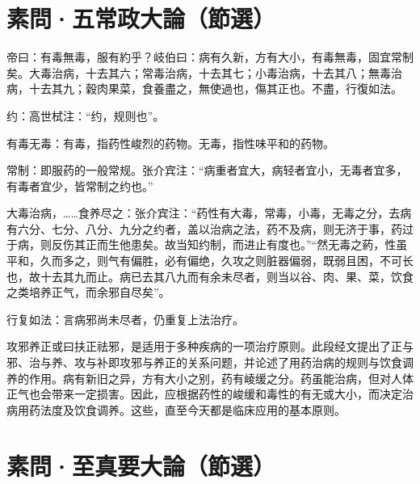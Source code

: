 \documentclass[draft,12pt]{ctexbook}
\begin{document}

\section{素問·五常政大論（節選）}%


\begin{yuanwen}
帝曰：有毒無毒，服有約乎？岐伯曰：病有久新，方有大小，有毒無毒，固宜常制矣。大毒治病，十去其六；常毒治病，十去其七；小毒治病，十去其八；無毒治病，十去其九；穀肉果菜，食養盡之，無使過也，傷其正也。不盡，行復如法。
\end{yuanwen}


\begin{jiaozhu}
  \item 约：高世栻注：“约，规则也”。
  \item 有毒无毒：有毒，指药性峻烈的药物。无毒，指性味平和的药物。
  \item 常制：即服药的一般常规。张介宾注：“病重者宜大，病轻者宜小，无毒者宜多，有毒者宜少，皆常制之约也。”
  \item 大毒治病，……食养尽之：张介宾注：“药性有大毒，常毒，小毒，无毒之分，去病有六分、七分、八分、九分之约者，盖以治病之法，药不及病，则无济于事，药过于病，则反伤其正而生他患矣。故当知约制，而进止有度也。”“然无毒之葯，性虽平和，久而多之，则气有偏胜，必有偏绝，久攻之则脏器偏弱，既弱且困，不可长也，故十去其九而止。病已去其八九而有余未尽者，则当以谷、肉、果、菜，饮食之类培养正气，而余邪自尽矣”。
  \item 行复如法：言病邪尚未尽者，仍重复上法治疗。
\end{jiaozhu}



攻邪养正或曰扶正祛邪，是适用于多种疾病的一项治疗原则。此段经文提出了正与邪、治与养、攻与补即攻邪与养正的关系问题，并论述了用药治病的规则与饮食调养的作用。病有新旧之异，方有大小之别，药有崚缓之分。药虽能治病，但对人体正气也会带来一定损害。因此，应根据药性的峻缓和毒性的有无或大小，而决定治病用药法度及饮食调养。这些，直至今天都是临床应用的基本原则。


\section{素問·至真要大論（節選）}%
\end{document}
